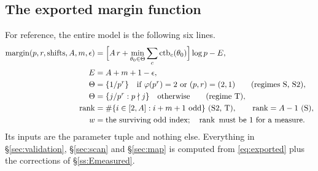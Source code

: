 \subsection{The exported margin function}\label{ss:exported}

For reference, the entire model is the following six lines.
\begin{equation}\label{eq:exported}
\begin{aligned}
 \marg(p,r,\text{shifts},A,m,\epsilon)
  &=\Bigl[A\,r+\min_{\theta_0\in\Theta}\sum_c\ctb_c(\theta_0)\Bigr]\log p-E,\\
 E&=A+m+1-\epsilon,\\
 \Theta&=\{1/p^r\}\quad\text{if }\varphi(p^r)=2\text{ or }(p,r)=(2,1)
   \qquad\text{(regimes S, S2)},\\
 \Theta&=\{j/p^r:p\nmid j\}\quad\text{otherwise}\qquad\text{(regime T)},\\
 \rk&=\#\{i\in[2,A]:i+m+1\ \text{odd}\}\ \text{(S2, T)},\qquad \rk=A-1\ \text{(S)},\\
 w&=\text{the surviving odd index};\quad \rk\ \text{must be }1\ \text{for a measure}.
\end{aligned}
\end{equation}
Its inputs are the parameter tuple and nothing else. Everything in \S\ref{sec:validation},
\S\ref{sec:scan} and \S\ref{sec:map} is computed from \eqref{eq:exported} plus the
corrections of \S\ref{ss:Emeasured}.
